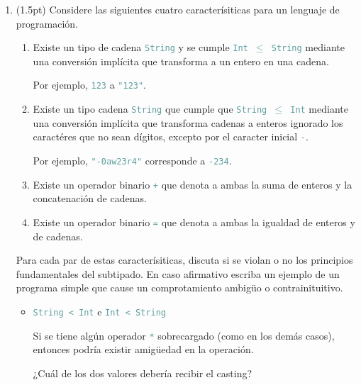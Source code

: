 \documentclass{article}
\newcommand{\tp}[1]{\textcolor{CadetBlue} {\texttt{#1}}}
\newcommand{\pt}[1]{\textcolor{RoyalPurple}{(#1pt)}}
\begin{document}
\begin{enumerate}
\begin{verbatim}
cpsN x k = cpsf x (\v1 -> cpsg y (\v2 -> cpsh v1 (44 -y) v2 (\v3 -> k v3)))
		\end{verbatim}

		$ $\\

        \item \pt{1.5} Considere las siguientes cuatro caracterísiticas para un
        lenguaje de programación.

        \begin{enumerate}
            \item Existe un tipo de cadena \tp{String} y se cumple
            \tp{Int $\leq$ String} mediante una conversión implícita que
            transforma a un entero en una cadena.

            Por ejemplo, \tp{123} a \tp{"123"}.

            \item Existe un tipo cadena \tp{String} que cumple que
            \tp{String $\leq$ Int} mediante una conversión implícita que
            transforma cadenas a enteros ignorado los caractéres que no sean
            dígitos, excepto por el caracter inicial \tp{-}.

            Por ejemplo, \tp{"}\tp{-0aw23r4"} corresponde a \tp{-234}.

            \item Existe un operador binario \tp{+} que denota a ambas la suma
            de enteros y la concatenación de cadenas.

            \item Existe un operador binario \tp{=} que denota a ambas la
            igualdad de enteros y de cadenas.
        \end{enumerate}

        Para cada par de estas caracterísiticas, discuta si se violan o no los
        principios fundamentales del subtipado. En caso afirmativo escriba un
        ejemplo de un programa simple que cause un comprotamiento ambigüo o
        contrainituitivo.

        \begin{itemize}
            \item \tp{String < Int} e \tp{Int < String}

            Si se tiene algún operador \tp{*} sobrecargado (como en los demás
            casos), entonces podría existir amigüedad en la operación.

            ¿Cuál de los dos valores debería recibir el casting?


\end{itemize}
\end{enumerate}
\end{document}

